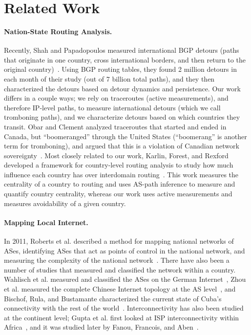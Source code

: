 \section{Related Work}
\label{related}

\paragraph{Nation-State Routing Analysis.}  Recently, Shah and Papadopoulos measured international BGP detours (paths that originate in one country, cross international borders, and then return to the original country)~\cite{shah2015characterizing}.  Using BGP routing tables, they found 2 million detours in each month of their study (out of 7 billion total paths), and they then characterized the detours based on detour dynamics and persistence.  Our work differs in a couple ways; we rely on traceroutes (active measurements), and therefore IP-level paths, to measure international detours (which we call tromboning paths), and we characterize detours based on which countries they transit.  Obar and Clement analyzed traceroutes that started and ended in Canada, but ``boomeranged'' through the United States (``boomerang'' is another term for tromboning), and argued that this is a violation of Canadian network sovereignty~\cite{obar2012internet}.  Most closely related to our work, Karlin, Forest, and Rexford developed a framework for country-level routing analysis to study how much influence each country has over interdomain routing~\cite{karlin2009nation}.  This work measures the centrality of a country to routing and uses AS-path inference to measure and quantify country centrality, whereas our work uses active measurements and measures avoidability of a given country.

\paragraph{Mapping Local Internet.}  In 2011, Roberts et al. described
a method for mapping national networks of ASes, identifying ASes that
act as points of control in the national network, and measuring the
complexity of the national network~\cite{roberts2011mapping}.  There
have also been a number of studies that measured and classified the
network within a country.  Wahlisch et al. measured and classified the
ASes on the German Internet~\cite{wahlisch2010framework,
  wahlisch2012exposing}, Zhou et al. measured the complete
Chinese Internet topology at the AS level~\cite{zhou2007chinese}, and
Bischof, Rula, and Bustamante characterized the current state of Cuba's
connectivity with the rest of the world~\cite{bischof2015and}.
Interconnectivity has also been studied at the continent level; Gupta
et al. first looked at ISP interconnectivity within
Africa~\cite{gupta2014peering}, and it was studied later by Fanou,
Francois, and Aben~\cite{fanou2015diversity}. 


